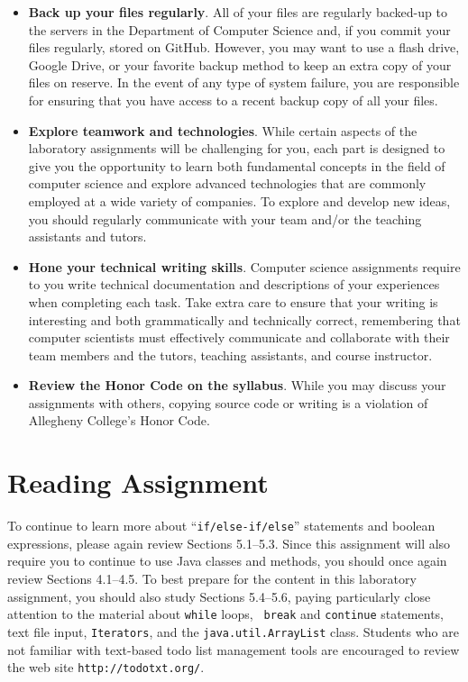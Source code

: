 \documentclass[11pt]{article}
\newcommand{\url}[1]{\lstinline{#1}}
\begin{document}
\begin{itemize}
\item {\bf Back up your files regularly}. All of your files are regularly backed-up to the servers in the Department of
  Computer Science and, if you commit your files regularly, stored on GitHub. However, you may want to use a flash
  drive, Google Drive, or your favorite backup method to keep an extra copy of your files on reserve. In the event of
  any type of system failure, you are responsible for ensuring that you have access to a recent backup copy of all your
  files.

\item {\bf Explore teamwork and technologies}. While certain aspects of the laboratory assignments will be challenging
  for you, each part is designed to give you the opportunity to learn both fundamental concepts in the field of computer
  science and explore advanced technologies that are commonly employed at a wide variety of companies. To explore and
  develop new ideas, you should regularly communicate with your team and/or the teaching assistants and tutors.

\item {\bf Hone your technical writing skills}. Computer science assignments require to you write technical
  documentation and descriptions of your experiences when completing each task. Take extra care to ensure that your
  writing is interesting and both grammatically and technically correct, remembering that computer scientists must
  effectively communicate and collaborate with their team members and the tutors, teaching assistants, and course
  instructor.

\item {\bf Review the Honor Code on the syllabus}. While you may discuss your assignments with others, copying source
  code or writing is a violation of Allegheny College's Honor Code.

\end{itemize}

\section*{Reading Assignment}

To continue to learn more about ``{\tt if/else-if/else}'' statements and boolean
expressions, please again review Sections 5.1--5.3. Since this assignment will
also require you to continue to use Java classes and methods, you should once
again review Sections 4.1--4.5. To best prepare for the content in this
laboratory assignment, you should also study Sections 5.4--5.6, paying
particularly close attention to the material about {\tt while} loops, {\tt
break} and {\tt continue} statements, text file input, {\tt Iterators}, and the
{\tt java.util.ArrayList} class. Students who are not familiar with text-based
todo list management tools are encouraged to review the web site
\url{http://todotxt.org/}.
\end{document}
